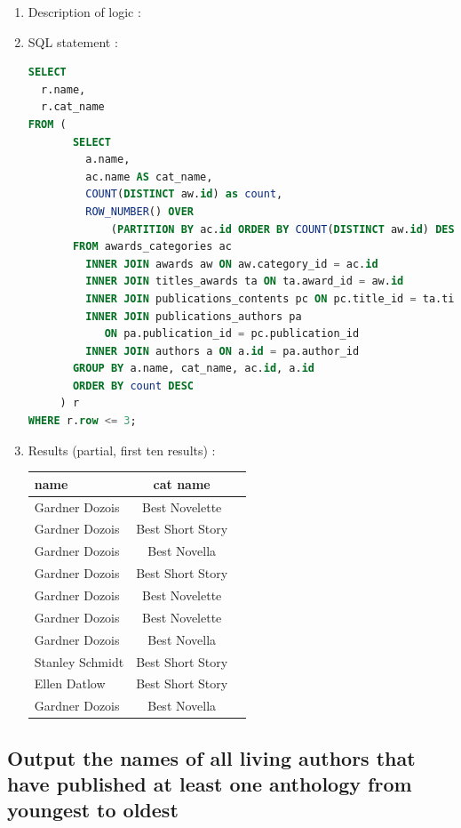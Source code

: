 \documentclass[doubleside, titlepage]{article}
\begin{document}
	\begin{enumerate}
	\item Description of logic : %
	\item SQL statement :
		\begin{lstlisting}[language=SQL,showspaces=false,basicstyle=\ttfamily,numberstyle=\tiny,commentstyle=\color{gray}]
SELECT
  r.name,
  r.cat_name
FROM (
       SELECT
         a.name,
         ac.name AS cat_name,
         COUNT(DISTINCT aw.id) as count,
         ROW_NUMBER() OVER 
             (PARTITION BY ac.id ORDER BY COUNT(DISTINCT aw.id) DESC) AS row
       FROM awards_categories ac
         INNER JOIN awards aw ON aw.category_id = ac.id
         INNER JOIN titles_awards ta ON ta.award_id = aw.id
         INNER JOIN publications_contents pc ON pc.title_id = ta.title_id
         INNER JOIN publications_authors pa 
         	ON pa.publication_id = pc.publication_id
         INNER JOIN authors a ON a.id = pa.author_id
       GROUP BY a.name, cat_name, ac.id, a.id
       ORDER BY count DESC
     ) r
WHERE r.row <= 3;
		\end{lstlisting}

	\item Results (partial, first ten results) :\\

	\begin{tabular}{|l|c|r|}
	  \hline
		name & cat name \\
	  \hline
Gardner Dozois	& Best Novelette\\
Gardner Dozois	& Best Short Story\\
Gardner Dozois	& Best Novella\\
Gardner Dozois	& Best Short Story\\
Gardner Dozois	& Best Novelette\\
Gardner Dozois	& Best Novelette\\
Gardner Dozois	& Best Novella\\
Stanley Schmidt	& Best Short Story\\
Ellen Datlow	& Best Short Story\\
Gardner Dozois	& Best Novella\\
	  \hline
	\end{tabular}
\end{enumerate}

\subsection{Output the names of all living authors that have published at least one anthology from youngest to oldest}
\end{document}
